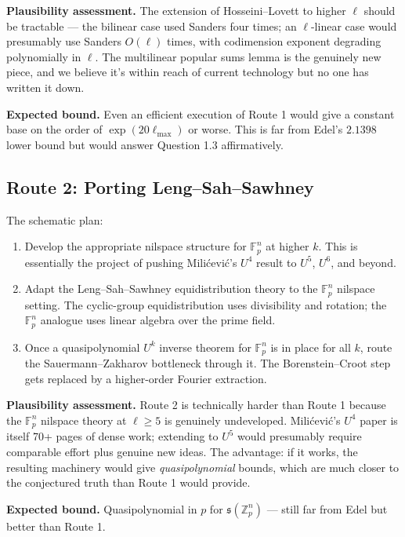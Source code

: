 \documentclass[11pt,a4paper]{article}
\theoremstyle{plain}
\theoremstyle{definition}
\theoremstyle{remark}
\newcommand{\F}{\mathbb{F}}
\newcommand{\Z}{\mathbb{Z}}
\newcommand{\sUFp}{\mathfrak{s}}
\begin{document}
\textbf{Plausibility assessment.} The extension of Hosseini--Lovett to higher $\ell$ should be tractable --- the bilinear case used Sanders four times; an $\ell$-linear case would presumably use Sanders $O(\ell)$ times, with codimension exponent degrading polynomially in $\ell$. The multilinear popular sums lemma is the genuinely new piece, and we believe it's within reach of current technology but no one has written it down.

\textbf{Expected bound.} Even an efficient execution of Route 1 would give a constant base on the order of $\exp(20 \ell_{\max})$ or worse. This is far from Edel's $2.1398$ lower bound but would answer Question 1.3 affirmatively.

\subsection{Route 2: Porting Leng--Sah--Sawhney}

The schematic plan:

\begin{enumerate}[leftmargin=2em]
  \item Develop the appropriate nilspace structure for $\F_p^n$ at higher $k$. This is essentially the project of pushing Milićević's $U^4$ result to $U^5$, $U^6$, and beyond.
  
  \item Adapt the Leng--Sah--Sawhney equidistribution theory to the $\F_p^n$ nilspace setting. The cyclic-group equidistribution uses divisibility and rotation; the $\F_p^n$ analogue uses linear algebra over the prime field.
  
  \item Once a quasipolynomial $U^k$ inverse theorem for $\F_p^n$ is in place for all $k$, route the Sauermann--Zakharov bottleneck through it. The Borenstein--Croot step gets replaced by a higher-order Fourier extraction.
\end{enumerate}

\textbf{Plausibility assessment.} Route 2 is technically harder than Route 1 because the $\F_p^n$ nilspace theory at $\ell \geq 5$ is genuinely undeveloped. Milićević's $U^4$ paper is itself 70+ pages of dense work; extending to $U^5$ would presumably require comparable effort plus genuine new ideas. The advantage: if it works, the resulting machinery would give \emph{quasipolynomial} bounds, which are much closer to the conjectured truth than Route 1 would provide.

\textbf{Expected bound.} Quasipolynomial in $p$ for $\sUFp(\Z_p^n)$ --- still far from Edel but better than Route 1.
\end{document}
